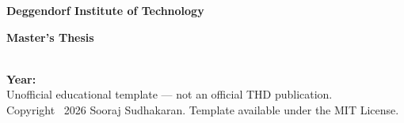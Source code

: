 \begin{titlepage}
  \thispagestyle{empty}
  \begin{center}
    \vspace*{0.5cm}
    {\bfseries\large Deggendorf Institute of Technology\par}
    \vspace{1.0cm}
    {\bfseries\huge Master's Thesis\par}
    \vspace*{\fill}
    {\bfseries\large \ThesisTitleGerman\par}
    \vspace{0.5cm}
    {\bfseries\large \ThesisTitle\par}
    \vspace*{\fill}
    {\bfseries\large \StudentName}\\[0.4cm]
    {\bfseries\large Year: \SubmissionYear}\\[0.8cm]
    {\footnotesize Unofficial educational template --- not an official THD publication.}\\[0.25cm]
    {\footnotesize Copyright \textcopyright\ 2026 Sooraj Sudhakaran. Template available under the MIT License.}
  \end{center}
\end{titlepage}
